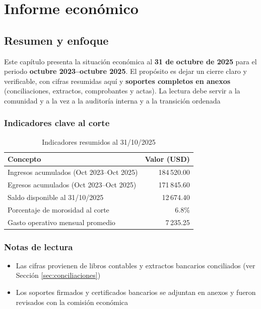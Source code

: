 \chapter{Informe económico}
\label{ch:informe_economico}

\section{Resumen y enfoque}
\label{sec:resumen_enfoque}

Este capítulo presenta la situación económica al \textbf{31 de octubre de 2025} para el periodo \textbf{octubre 2023–octubre 2025}. El propósito es dejar un cierre claro y verificable, con cifras resumidas aquí y \textbf{soportes completos en anexos} (conciliaciones, extractos, comprobantes y actas). La lectura debe servir a la comunidad y a la vez a la auditoría interna y a la transición ordenada

\subsection*{Indicadores clave al corte}
\begin{table}[H]
\centering
\caption{Indicadores resumidos al 31/10/2025}
\label{tab:indicadores_resumen}
\begin{singlespace}
\begin{tabular}{p{9cm} r}
\toprule
\textbf{Concepto} & \textbf{Valor (USD)} \\
\midrule
Ingresos acumulados (Oct 2023–Oct 2025) & 184\,520.00 \\
Egresos acumulados (Oct 2023–Oct 2025) & 171\,845.60 \\
Saldo disponible al 31/10/2025 & 12\,674.40 \\
\midrule
Porcentaje de morosidad al corte & 6.8\% \\
Gasto operativo mensual promedio & 7\,235.25 \\
\bottomrule
\end{tabular}
\end{singlespace}
\end{table}

\subsection*{Notas de lectura}
\begin{itemize}
  \item Las cifras provienen de libros contables y extractos bancarios conciliados (ver Sección \ref{sec:conciliaciones})
  \item Los soportes firmados y certificados bancarios se adjuntan en anexos y fueron revisados con la comisión económica
\end{itemize}

